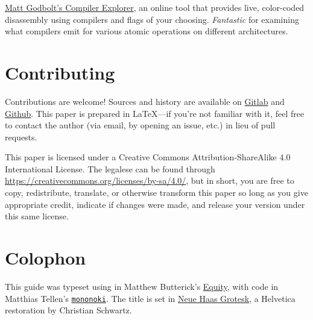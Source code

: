 \documentclass[fontsize=\bodyfontsize, numbers=endperiod]{scrartcl}
\begin{document}
\begin{adjustwidth}{1in}{1in}
\href{https://godbolt.org/}{Matt Godbolt's Compiler Explorer},
an online tool that provides live, color-coded disassembly using compilers and
flags of your choosing.
\emph{Fantastic} for examining what compilers emit for various
atomic operations on different architectures.

\section{Contributing}

Contributions are welcome!
Sources and history are available on
\href{https://gitlab.com/mrkline/concurrency-primer}{Gitlab}
and
\href{https://github.com/mrkline/concurrency-primer}{Github}.
This paper is prepared in \LaTeX{}---if you're not familiar with it,
feel free to contact the author
(via email, by opening an issue, etc.)
in lieu of pull requests.

This paper is licensed under a
Creative Commons Attribution-ShareAlike 4.0 International License.
The legalese can be found through
\url{https://creativecommons.org/licenses/by-sa/4.0/},
but in short,
you are free to copy, redistribute, translate, or otherwise transform this paper
so long as you give appropriate credit, indicate if changes were made,
and release your version under this same license.

\section{Colophon}

This guide was typeset using \LuaLaTeX{}
in Matthew Butterick's
\href{https://typographyforlawyers.com/equity.html}{Equity},
with code in Matthias Tellen's
\href{https://madmalik.github.io/mononoki/}{\texttt{mononoki}}.
The title is set in
\href{http://www.fontbureau.com/NHG/}{\textsf{\small Neue Haas Grotesk}},
a Helvetica restoration by Christian Schwartz.
\ifebook
\else
\end{adjustwidth}
\fi
\end{document}
